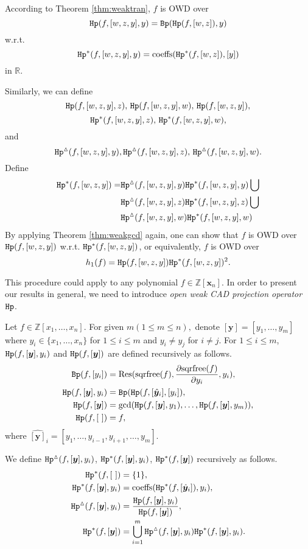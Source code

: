 \documentclass[amsthm]{elsart}
\def \coeffs{{\rm coeffs}}
\def \Res  {{\rm Res}}
\def \sqrfree  {{\rm sqrfree}}
\def \Bproj  {{\tt Bp}}
\def  \Hproj {{\tt Hp}}
\def \RR {{\mathbb R}}
\def \ZZ {{\mathbb Z}}
\newcommand{\xx}{\bm{x}}
\newcommand{\yy}{\bm{y}}
\begin{document}
According to Theorem \ref{thm:weaktran}, $f$ is OWD over $$\Hproj(f,[w,z,y],y)=\Bproj(\Hproj(f,[w,z]),y)$$
w.r.t. $${\Hproj^{\ast}(f,[w,z,y],y)}=\coeffs({\Hproj^{\ast}(f,[w,z])},[y])$$
in $\RR$.

Similarly, we can define
$$\Hproj(f,[w,z,y],z),\, \Hproj(f,[w,z,y],w),\, \Hproj(f,[w,z,y]),$$
$${\Hproj^{\ast}(f,[w,z,y],z)},\,\Hproj^{\ast}(f,[w,z,y],w),$$
and
$${\Hproj^{\vartriangle}(f,[w,z,y],y)},{\Hproj^{\vartriangle}(f,[w,z,y],z)},\,\Hproj^{\vartriangle}(f,[w,z,y],w).$$
Define
\begin{align*}
\Hproj^{\ast}(f,[w,z,y])=&\Hproj^{\vartriangle}(f,[w,z,y],y)\Hproj^{\ast}(f,[w,z,y],y)\bigcup\\
& \Hproj^{\vartriangle}(f,[w,z,y],z)\Hproj^{\ast}(f,[w,z,y],z)\bigcup\\
&\Hproj^{\vartriangle}(f,[w,z,y],w)\Hproj^{\ast}(f,[w,z,y],w)
\end{align*}
By applying Theorem \ref{thm:weakgcd} again, one can show that $f$ is OWD over $\Hproj(f,[w,z,y])$ w.r.t. $\Hproj^{\ast}(f,[w,z,y])$, or equivalently, $f$ is OWD over
$$h_1(f)=\Hproj(f,[w,z,y])\Hproj^{\ast}(f,[w,z,y])^2.$$

This procedure could apply to any polynomial $f\in\ZZ[\xx_n]$. In order to present our results in general, we need to introduce \emph{open weak CAD projection operator} $\Hproj$.
\begin{defn}\label{def:hp}
Let $f\in \ZZ[x_1,\ldots,x_n]$. For given $m (1\le m\le n),$ denote $[\yy]=[y_1,\dots,y_{m}]$ where $ y_i \in \{x_1,\dots,x_n\}$ for $1\le i\le m$ and $y_i\neq y_j$ for $i\neq j$. For $1\le i\le m$,
$\Hproj(f,[\yy],y_i)$ and $\Hproj(f,[\yy])$ are defined recursively as follows.
        \begin{align*}
                 \Bproj(f,[y_i])    &=\Res(\sqrfree(f),\frac{\partial \sqrfree(f)}{\partial y_{i}}, y_{i}),\\
                \Hproj(f,[\yy],y_i) &=\Bproj(\Hproj(f,[\hat{\yy}_i],[y_i]),\\
                \Hproj(f,[\yy])     &=\gcd(\Hproj(f,[\yy],y_1),\ldots,\Hproj(f,[\yy],y_m)),\\
                \Hproj(f,[~])       &=f,
    \end{align*}
where $\hat{[\yy]}_i=[y_1,\ldots,y_{i-1},y_{i+1},\ldots,y_{m}]$.

We define ${\Hproj^{\vartriangle}(f,[\yy],y_i)}$, $\Hproj^{\ast}(f,[\yy],y_i)$, $\Hproj^{\ast}(f,[\yy])$ recursively as follows.
\begin{align*}
\Hproj^{\ast}(f,[~])&=\{1\},\\
{\Hproj^{\ast}(f,[\yy],y_i)}&=\coeffs({\Hproj^{\ast}(f,[\hat{\yy}_i])},y_i),\\
{\Hproj^{\vartriangle}(f,[\yy],y_i)}&=\frac{\Hproj(f,[\yy],y_i)}{\Hproj(f,[\yy])},\\
{\Hproj^{\ast}(f,[\yy])}&=\bigcup_{i=1}^m {\Hproj^{\vartriangle}(f,[\yy],y_i)}{\Hproj^{\ast}(f,[\yy],y_i)}.
\end{align*}
\end{defn}
\end{document}
